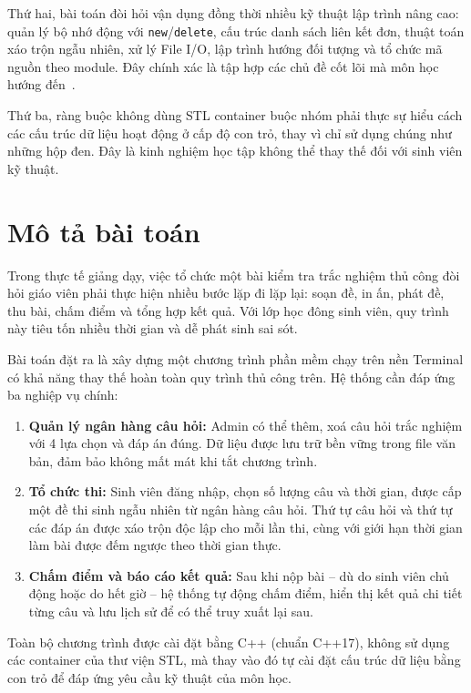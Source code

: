 \documentclass[11pt]{report}
\begin{document}
Thứ hai, bài toán đòi hỏi vận dụng đồng thời nhiều kỹ thuật lập trình nâng cao: quản lý bộ nhớ động với \texttt{new}/\texttt{delete}, cấu trúc danh sách liên kết đơn, thuật toán xáo trộn ngẫu nhiên, xử lý File I/O, lập trình hướng đối tượng và tổ chức mã nguồn theo module. Đây chính xác là tập hợp các chủ đề cốt lõi mà môn học hướng đến~\cite{nam2022}.

Thứ ba, ràng buộc không dùng STL container buộc nhóm phải thực sự hiểu cách các cấu trúc dữ liệu hoạt động ở cấp độ con trỏ, thay vì chỉ sử dụng chúng như những hộp đen. Đây là kinh nghiệm học tập không thể thay thế đối với sinh viên kỹ thuật.

\section{Mô tả bài toán}

Trong thực tế giảng dạy, việc tổ chức một bài kiểm tra trắc nghiệm thủ công đòi hỏi giáo viên phải thực hiện nhiều bước lặp đi lặp lại: soạn đề, in ấn, phát đề, thu bài, chấm điểm và tổng hợp kết quả. Với lớp học đông sinh viên, quy trình này tiêu tốn nhiều thời gian và dễ phát sinh sai sót.

Bài toán đặt ra là xây dựng một chương trình phần mềm chạy trên nền Terminal có khả năng thay thế hoàn toàn quy trình thủ công trên. Hệ thống cần đáp ứng ba nghiệp vụ chính:

\begin{enumerate}[leftmargin=*, label=\arabic*.]
    \item \textbf{Quản lý ngân hàng câu hỏi:} Admin có thể thêm, xoá câu hỏi trắc nghiệm với 4 lựa chọn và đáp án đúng. Dữ liệu được lưu trữ bền vững trong file văn bản, đảm bảo không mất mát khi tắt chương trình.

    \item \textbf{Tổ chức thi:} Sinh viên đăng nhập, chọn số lượng câu và thời gian, được cấp một đề thi sinh ngẫu nhiên từ ngân hàng câu hỏi. Thứ tự câu hỏi và thứ tự các đáp án được xáo trộn độc lập cho mỗi lần thi, cùng với giới hạn thời gian làm bài được đếm ngược theo thời gian thực.

    \item \textbf{Chấm điểm và báo cáo kết quả:} Sau khi nộp bài -- dù do sinh viên chủ động hoặc do hết giờ -- hệ thống tự động chấm điểm, hiển thị kết quả chi tiết từng câu và lưu lịch sử để có thể truy xuất lại sau.
\end{enumerate}

Toàn bộ chương trình được cài đặt bằng C++ (chuẩn C++17), không sử dụng các container của thư viện STL, mà thay vào đó tự cài đặt cấu trúc dữ liệu bằng con trỏ để đáp ứng yêu cầu kỹ thuật của môn học.
\end{document}

